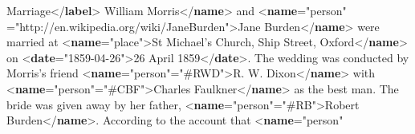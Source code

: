 \begin{shaded}
\hspace*{1em}Marriage{</\textbf{label}>}\mbox{}\newline 
\hspace*{1em}\mbox{}\newline 
\hspace*{1em}\hspace*{1em}William Morris{</\textbf{name}>} and {<\textbf{name}\hspace*{1em}{type}="{person}"\mbox{}\newline 
\hspace*{1em}\hspace*{1em}\hspace*{1em}\hspace*{1em}{ref}="{http://en.wikipedia.org/wiki/Jane\textunderscore Burden}">}Jane Burden{</\textbf{name}>} were married at {<\textbf{name}\hspace*{1em}{type}="{place}">}St\mbox{}\newline 
\hspace*{1em}\hspace*{1em}\hspace*{1em}\hspace*{1em}\hspace*{1em}\hspace*{1em} Michael's Church, Ship Street, Oxford{</\textbf{name}>} on {<\textbf{date}\hspace*{1em}{when}="{1859-04-26}">}26 April 1859{</\textbf{date}>}. The wedding was\mbox{}\newline 
\hspace*{1em}\hspace*{1em}\hspace*{1em}\hspace*{1em} conducted by Morris's friend {<\textbf{name}\hspace*{1em}{type}="{person}"\hspace*{1em}{ref}="{\#RWD}">}R. W. Dixon{</\textbf{name}>} with {<\textbf{name}\hspace*{1em}{type}="{person}"\hspace*{1em}{ref}="{\#CBF}">}Charles Faulkner{</\textbf{name}>} as the best man. The bride was given away by her father, {<\textbf{name}\hspace*{1em}{type}="{person}"\hspace*{1em}{ref}="{\#RB}">}Robert Burden{</\textbf{name}>}. According to the account that {<\textbf{name}\hspace*{1em}{type}="{person}"\mbox{}\newline 
}
\end{shaded}
